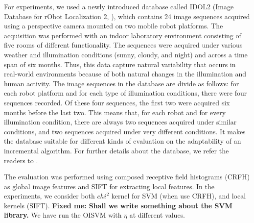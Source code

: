 For experiments, we used a newly introduced database called IDOL2 (Image Database
for rObot Localization 2, \cite{luo:idol2}), which contains 24 image sequences acquired
using a perspective camera mounted on two mobile robot platforms. The acquisition was
performed with an indoor laboratory environment consisting of five rooms of different
functionality. The sequences were acquired under various weather and illumination conditions
(sunny, cloudy, and night) and across a time span of six months. Thus, this data capture
natural variability that occurs in real-world environments because of both natural changes
in the illumination and human activity. The image sequences in the database are divide as
follows: for each robot platform and for each type of illumination conditions, there were
four sequences recorded. Of these four sequences, the first two were acquired six months
before the last two. This means that, for each robot and for every illumination condition,
there are always two sequences acquired under similar conditions, and two sequences acquired
under very different conditions. It makes the database suitable for different kinds of evaluation
on the adaptability of an incremental algorithm. For further details about the database, we
refer the readers to \cite{luo:idol2}.

The evaluation was performed using composed receptive field histograms (CRFH)
\cite{Linde:Lindeberg:ICPR04} as global image features and SIFT \cite{lowe99object}
for extracting local features. In the experiments, we consider
both $chi^2$ kernel for SVM (when use CRFH), and local kernels \cite{wallraven:iccv03} (SIFT).
\textbf{Fixed me: Shall we write something about the SVM library.} We have run the OISVM with
$\eta$ at different values. 

